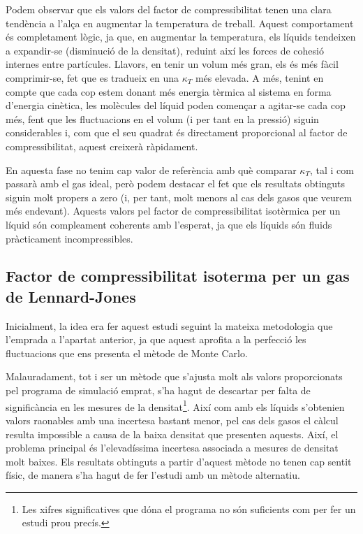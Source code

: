 \documentclass[a4paper,10.5pt]{report}
\begin{document}
Podem observar que els valors del factor de compressibilitat tenen una clara tendència a l'alça en augmentar la temperatura de treball. Aquest comportament és completament lògic, ja que, en augmentar la temperatura, els líquids tendeixen a expandir-se (disminució de la densitat), reduint així les forces de cohesió internes entre partícules. Llavors, en tenir un volum més gran, els és més fàcil comprimir-se, fet que es tradueix en una $\kappa_T$ més elevada. A més, tenint en compte que cada cop estem donant més energia tèrmica al sistema en forma d'energia cinètica, les molècules del líquid poden començar a agitar-se cada cop més, fent que les fluctuacions en el volum (i per tant en la pressió) siguin considerables i, com que el seu quadrat és directament proporcional al factor de compressibilitat, aquest creixerà ràpidament.

En aquesta fase no tenim cap valor de referència amb què comparar $\kappa_T$, tal i com passarà amb el gas ideal, però podem destacar el fet que els resultats obtinguts siguin molt propers a zero (i, per tant, molt menors al cas dels gasos que veurem més endevant). Aquests valors pel factor de compressibilitat isotèrmica per un líquid són compleament coherents amb l'esperat, ja que els líquids són fluids pràcticament incompressibles.

\subsection{Factor de compressibilitat isoterma per un gas de Lennard-Jones}
Inicialment, la idea era fer aquest estudi seguint la mateixa metodologia que l'emprada a l'apartat anterior, ja que aquest aprofita a la perfecció les fluctuacions que ens presenta el mètode de Monte Carlo.

Malauradament, tot i ser un mètode que s'ajusta molt als valors proporcionats pel programa de simulació emprat, s'ha hagut de descartar per falta de significància en les mesures de la densitat\footnote{Les xifres significatives que dóna el programa no són suficients com per fer un estudi prou precís.}. Així com amb els líquids s'obtenien valors raonables amb una incertesa bastant menor, pel cas dels gasos el càlcul resulta impossible a causa de la baixa densitat que presenten aquests. Així, el problema principal és l'elevadíssima incertesa associada a mesures de densitat molt baixes. Els resultats obtinguts a partir d'aquest mètode no tenen cap sentit físic, de manera s'ha hagut de fer l'estudi amb un mètode alternatiu.
\end{document}
